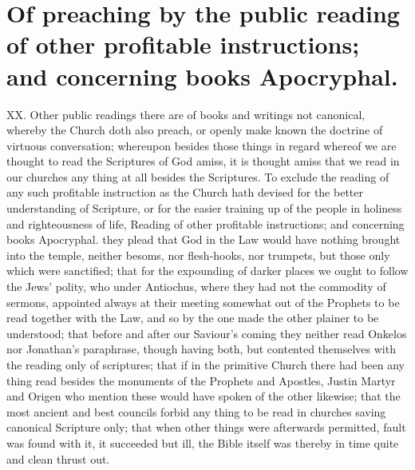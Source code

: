 \section*{Of preaching by the public reading of other profitable instructions; and concerning books Apocryphal.}
XX. Other public readings there are of books and writings not canonical, whereby the Church doth also preach, or openly  make known the doctrine of virtuous conversation; whereupon besides those things in regard whereof we are thought to read the Scriptures of God amiss, it is thought amiss that we read in our churches any thing at all besides the Scriptures.
 To exclude the reading of any such profitable instruction as the Church hath devised for the better understanding of Scripture, or for the easier training up of the people in holiness and righteousness of life,
Reading of other profitable instructions; and concerning books Apocryphal.
 they plead that God in the Law would have nothing brought into the temple, neither besoms, nor flesh-hooks, nor trumpets, but those only which were sanctified; that for the expounding of darker places we ought to follow the Jews’ polity, who under Antiochus, where they  had not the commodity of sermons, appointed always at their meeting somewhat out of the Prophets to be read together with the Law,
 and so by the one made the other plainer to be understood; that before and after our Saviour’s coming they neither read Onkelos nor Jonathan’s paraphrase, though having both, but contented themselves with the reading only of scriptures; that if in the primitive Church there had been any thing read besides the monuments of the Prophets and Apostles, Justin Martyr and Origen who mention these would have spoken of the other likewise; that the most ancient and best councils forbid any thing to be read in churches saving canonical Scripture only; that when other things were afterwards permitted, fault was found with it, it succeeded but ill, the Bible itself was thereby in time quite and clean thrust out.

